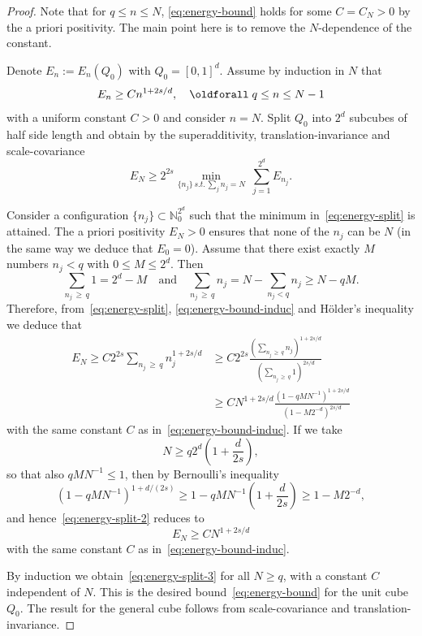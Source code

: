 \documentclass[AHL, Unicode, longabstracts, published]{cedram}
\newcommand\1{{\ensuremath {\mathds 1} }}
\renewcommand*{\forall}{\mathrel{\oldforall}}
\begin{document}
\begin{proof}
Note that for $q \le n \le N$, \eqref{eq:energy-bound} holds for some $C=C_N > 0$ by the a priori positivity. The main point here is to remove the $N$-dependence of the constant.

Denote $E_n := E_n(Q_0)$ with $Q_0=[0,1]^d$. Assume by induction in $N$ that
\begin{equation}\label{eq:energy-bound-induc}
E_n\ge C n^{1+2s/d}, \quad \forall q \le n \le N-1
\end{equation}
with a uniform constant $C>0$ and consider $n=N$. Split $Q_0$ into $2^d$ subcubes of half side length and obtain by the superadditivity, translation-invariance and scale-covariance
\begin{equation}\label{eq:energy-split}
E_{N} \ge 2^{2s} \min_{\{n_j\} \, s.t.\, \sum_j n_j = N} \ \sum_{j=1}^{2^d} E_{n_j}.
\end{equation}

Consider a configuration $\{n_j\}\subset \mathbb{N}_0^{2^d}$ such that the minimum in~\eqref{eq:energy-split} is attained. The a priori positivity $E_N>0$ ensures that none of the $n_j$ can be $N$ (in the same way we deduce that $E_0 = 0$). Assume that there exist exactly $M$ numbers $n_j < q$ with $0 \le M \le 2^d$. Then
\[
\sum_{n_j \,\ge\,q} 1 = 2^d - M
\quad \text{and} \quad
\sum_{n_j\,\ge\,q} n_j = N - \sum_{n_j<q} n_j \ge N - qM.
\]
Therefore, from~\eqref{eq:energy-split}, \eqref{eq:energy-bound-induc} and H\"older's inequality we deduce that
\begin{align}\label{eq:energy-split-2}
E_{N} \ge C 2^{2s} \sum_{n_j\,\ge\,q} n_j^{1+2s/d}
&\ge C 2^{2s} \frac{\left(\sum_{n_j\,\ge\,q} n_j \right)^{1+2s/d}}{\left(\sum_{n_j\,\ge\,q} 1\right)^{2s/d}}\\
&\geq C N^{1+2s/d} \frac{\left(1 - qM N^{-1}\right)^{1+2s/d}}{\left(1 -M 2^{-d}\right)^{2s/d}}
\end{align}
with the same constant $C$ as in~\eqref{eq:energy-bound-induc}. If we take
\[
N \ge q2^{d} \left(1+\frac{d}{2s}\right),
\]
so that also $qMN^{-1} \le 1$, then by Bernoulli's inequality
\[
\left(1-qMN^{-1}\right)^{1+d/(2s)} \ge 1- qMN^{-1} \left(1+ \frac{d}{2s}\right) \ge 1-M2^{-d},
\]
and hence~\eqref{eq:energy-split-2} reduces to
\begin{equation}\label{eq:energy-split-3}
E_{N} \ge CN^{1+2s/d}
\end{equation}
with the same constant $C$ as in~\eqref{eq:energy-bound-induc}.

By induction we obtain~\eqref{eq:energy-split-3} for all $N\ge q$, with a constant $C$ independent of $N$. This is the desired bound~\eqref{eq:energy-bound} for the unit cube $Q_0$. The result for the general cube follows from scale-covariance and translation-invariance.
\end{proof}
\end{document}

